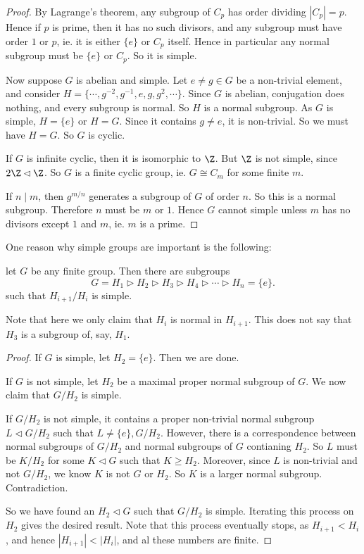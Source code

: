 \documentclass[a4paper]{article}
\begin{document}
\begin{proof}
  By Lagrange's theorem, any subgroup of $C_p$ has order dividing $|C_p| = p$. Hence if $p$ is prime, then it has no such divisors, and any subgroup must have order $1$ or $p$, ie. it is either $\{e\}$ or $C_p$ itself. Hence in particular any normal subgroup must be $\{e\}$ or $C_p$. So it is simple.

  Now suppose $G$ is abelian and simple. Let $e \not= g \in G$ be a non-trivial element, and consider $H = \{\cdots, g^{-2}, g^{-1}, e, g, g^2, \cdots\}$. Since $G$ is abelian, conjugation does nothing, and every subgroup is normal. So $H$ is a normal subgroup. As $G$ is simple, $H = \{e\}$ or $H = G$. Since it contains $g \not= e$, it is non-trivial. So we must have $H = G$. So $G$ is cyclic.

  If $G$ is infinite cyclic, then it is isomorphic to $\Z$. But $\Z$ is not simple, since $2\Z \lhd \Z$. So $G$ is a finite cyclic group, ie. $G \cong C_m$ for some finite $m$.

  If $n \mid m$, then $g^{m/n}$ generates a subgroup of $G$ of order $n$. So this is a normal subgroup. Therefore $n$ must be $m$ or $1$. Hence $G$ cannot simple unless $m$ has no divisors except $1$ and $m$, ie. $m$ is a prime.
\end{proof}

One reason why simple groups are important is the following:
\begin{thm}
  let $G$ be any finite group. Then there are subgroups
  \[
    G = H_1 \rhd H_2 \rhd H_3 \rhd H_4 \rhd \cdots \rhd H_n = \{e\}.
  \]
  such that $H_{i + 1}/H_i$ is simple.
\end{thm}
Note that here we only claim that $H_i$ is normal in $H_{i + 1}$. This does not say that $H_3$ is a subgroup of, say, $H_1$.

\begin{proof}
  If $G$ is simple, let $H_2 = \{e\}$. Then we are done.

  If $G$ is not simple, let $H_2$ be a maximal proper normal subgroup of $G$. We now claim that $G/H_2$ is simple.

  If $G/H_2$ is not simple, it contains a proper non-trivial normal subgroup $L \lhd G/H_2$ such that $L \not= \{e\}, G/H_2$. However, there is a correspondence between normal subgroups of $G/H_2$ and normal subgroups of $G$ contianing $H_2$. So $L$ must be $K/H_2$ for some $K \lhd G$ such that $K \geq H_2$. Moreover, since $L$ is non-trivial and not $G/H_2$, we know $K$ is not $G$ or $H_2$. So $K$ is a larger normal subgroup. Contradiction.

  So we have found an $H_2 \lhd G$ such that $G/H_2$ is simple. Iterating this process on $H_2$ gives the desired result. Note that this process eventually stops, as $H_{i + 1} < H_i$, and hence $|H_{i + 1}| < |H_i|$, and al these numbers are finite.
\end{proof}
\end{document}
